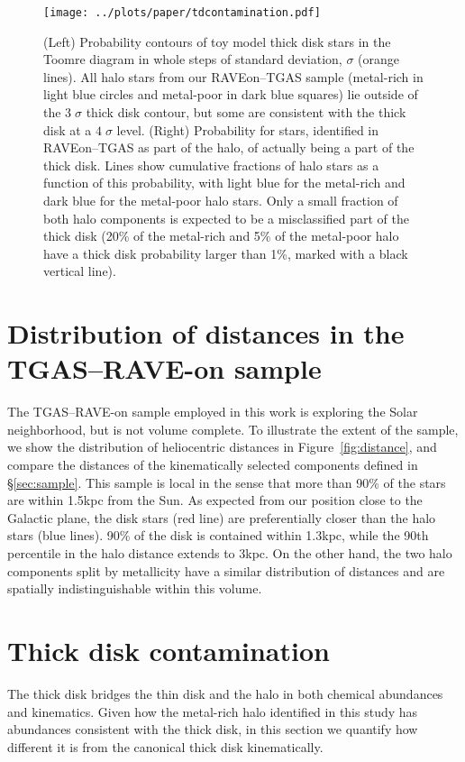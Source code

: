 \documentclass[apj, twocolappendix, numberedappendix, appendixfloats]{emulateapj}
\begin{document}
\begin{figure*}
\begin{center}
\texttt{[image: ../plots/paper/tdcontamination.pdf]}
\caption{(Left) Probability contours of toy model thick disk stars in the Toomre diagram in whole steps of standard deviation, $\sigma$ (orange lines).
All halo stars from our RAVEon--TGAS sample (metal-rich in light blue circles and metal-poor in dark blue squares) lie outside of the $3\;\sigma$ thick disk contour, but some are consistent with the thick disk at a $4\;\sigma$ level.
(Right) Probability for stars, identified in RAVEon--TGAS as part of the halo, of actually being a part of the thick disk.
Lines show cumulative fractions of halo stars as a function of this probability, with light blue for the metal-rich and dark blue for the metal-poor halo stars.
Only a small fraction of both halo components is expected to be a misclassified part of the thick disk (20\% of the metal-rich and 5\% of the metal-poor halo have a thick disk probability larger than 1\%, marked with a black vertical line).}
\label{fig:tdcont}
\end{center}
\end{figure*}




\appendix{}
\section{Distribution of distances in the TGAS--RAVE-on sample}
\label{sec:distances}
The TGAS--RAVE-on sample employed in this work is exploring the Solar neighborhood, but is not volume complete.
To illustrate the extent of the sample, we show the distribution of heliocentric distances in Figure~\ref{fig:distance}, and compare the distances of the kinematically selected components defined in \S\ref{sec:sample}.
This sample is local in the sense that more than 90\% of the stars are within 1.5\;kpc from the Sun.
As expected from our position close to the Galactic plane, the disk stars (red line) are preferentially closer than the halo stars (blue lines).
90\% of the disk is contained within 1.3\;kpc, while the 90th percentile in the halo distance extends to 3\;kpc.
On the other hand, the two halo components split by metallicity have a similar distribution of distances and are spatially indistinguishable within this volume.


\section{Thick disk contamination}
\label{sec:tdcontamination}
The thick disk bridges the thin disk and the halo in both chemical abundances and kinematics.
Given how the metal-rich halo identified in this study has abundances consistent with the thick disk, in this section we quantify how different it is from the canonical thick disk kinematically.
\end{document}
